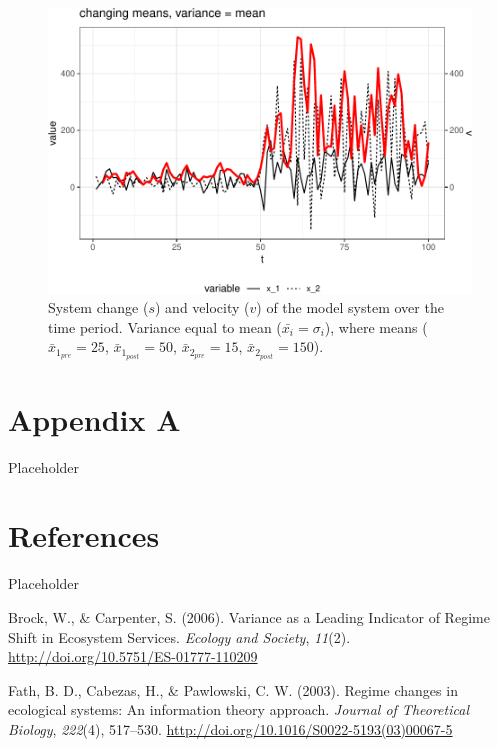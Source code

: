 \documentclass[12pt,twoside,openany]{reedthesis}
\begin{document}
\begin{figure}
\centering
\includegraphics{_myDissertation_files/figure-latex/velocSysEx4-1.pdf}
\caption{\label{fig:velocSysEx4}System change (\(s\)) and velocity (\(v\)) of the model system over the time period. Variance equal to mean (\(\bar{x_i}=\sigma_i\)), where means (\(\bar{x}_{1_{pre}}=25\), \(\bar{x}_{1_{post}}=50\), \(\bar{x}_{2_{pre}}=15\), \(\bar{x}_{2_{post}}=150\)).}
\end{figure}
\hypertarget{rRDM}{%
\chapter*{Appendix A}\label{rRDM}}

Placeholder

\hypertarget{references}{%
\chapter*{References}\label{references}}

Placeholder

\hypertarget{refs}{}
\leavevmode\hypertarget{ref-brock_variance_2006}{}%
Brock, W., \& Carpenter, S. (2006). Variance as a Leading Indicator of Regime Shift in Ecosystem Services. \emph{Ecology and Society}, \emph{11}(2). \url{http://doi.org/10.5751/ES-01777-110209}

\leavevmode\hypertarget{ref-fath_regime_2003}{}%
Fath, B. D., Cabezas, H., \& Pawlowski, C. W. (2003). Regime changes in ecological systems: An information theory approach. \emph{Journal of Theoretical Biology}, \emph{222}(4), 517--530. \url{http://doi.org/10.1016/S0022-5193(03)00067-5}
\end{document}
